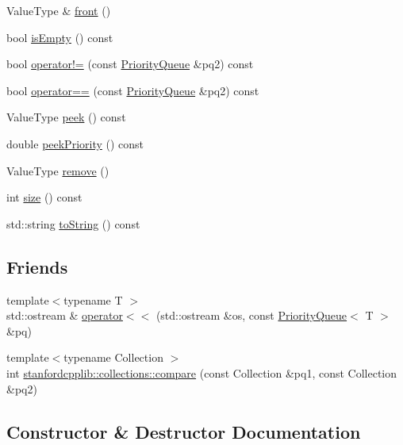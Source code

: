 \begin{DoxyCompactItemize}
\item 
Value\+Type \& \mbox{\hyperlink{classPriorityQueue_a736a6bda35a26620407e175bee46ae4a}{front}} ()
\item 
bool \mbox{\hyperlink{classPriorityQueue_acf82f9b2937375c7b1cf3dccb3df3312}{is\+Empty}} () const
\item 
bool \mbox{\hyperlink{classPriorityQueue_ae558f5c7424d82899a0872c8703e2445}{operator!=}} (const \mbox{\hyperlink{classPriorityQueue}{Priority\+Queue}} \&pq2) const
\item 
bool \mbox{\hyperlink{classPriorityQueue_ab32c20704a0dbe581c0a666156fa057a}{operator==}} (const \mbox{\hyperlink{classPriorityQueue}{Priority\+Queue}} \&pq2) const
\item 
Value\+Type \mbox{\hyperlink{classPriorityQueue_a7fcf31135d35acfa8ab1174c44bf28f3}{peek}} () const
\item 
double \mbox{\hyperlink{classPriorityQueue_ad3fce2f9d785c3232def3482817ec1c6}{peek\+Priority}} () const
\item 
Value\+Type \mbox{\hyperlink{classPriorityQueue_a025ec97fa5b04552f5ad0902c1f02ac1}{remove}} ()
\item 
int \mbox{\hyperlink{classPriorityQueue_af9593d4a5ff4274efaf429cb4f9e57cc}{size}} () const
\item 
std\+::string \mbox{\hyperlink{classPriorityQueue_a1fe5121d6528fdea3f243321b3fa3a49}{to\+String}} () const
\end{DoxyCompactItemize}
\subsection*{Friends}
\begin{DoxyCompactItemize}
\item 
{\footnotesize template$<$typename T $>$ }\\std\+::ostream \& \mbox{\hyperlink{classPriorityQueue_a533f07b48057f32ab7e31e23fdd21675}{operator$<$$<$}} (std\+::ostream \&os, const \mbox{\hyperlink{classPriorityQueue}{Priority\+Queue}}$<$ T $>$ \&pq)
\item 
{\footnotesize template$<$typename Collection $>$ }\\int \mbox{\hyperlink{classPriorityQueue_ac12ad2761ec7037f8866b726424a81e2}{stanfordcpplib\+::collections\+::compare}} (const Collection \&pq1, const Collection \&pq2)
\end{DoxyCompactItemize}


\subsection{Constructor \& Destructor Documentation}
\mbox{\label{classPriorityQueue_abc81897aed19eefcf321dcb7e12b166d}} 
